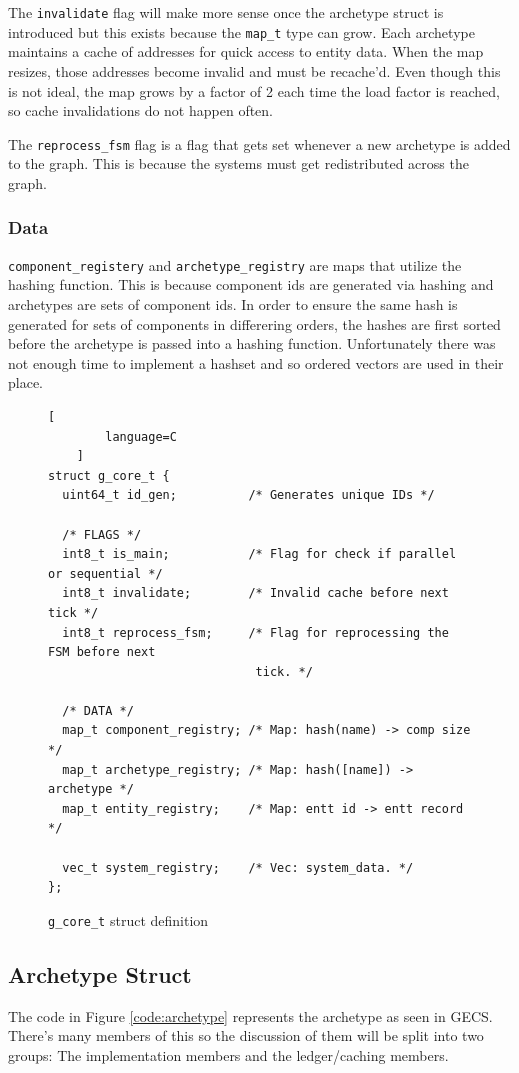 The \texttt{invalidate} flag will make more sense once the archetype struct is introduced but this exists because the \texttt{map\_t} type can grow. Each archetype maintains a cache of addresses for quick access to entity data. When the map resizes, those addresses become invalid and must be recache'd. Even though this is not ideal, the map grows by a factor of 2 each time the load factor is reached, so cache invalidations do not happen often. 

The \texttt{reprocess\_fsm} flag is a flag that gets set whenever a new archetype is added to the graph. This is because the systems must get redistributed across the graph.

\subsubsection{Data}
\texttt{component\_registery} and \texttt{archetype\_registry} are maps that utilize the hashing function. This is because component ids are generated via hashing and archetypes are sets of component ids. In order to ensure the same hash is generated for sets of components in differering orders, the hashes are first sorted before the archetype is passed into a hashing function. Unfortunately there was not enough time to implement a hashset and so ordered vectors are used in their place.

\begin{figure}[H]
    \begin{lstlisting}[
        language=C
    ]
struct g_core_t {
  uint64_t id_gen;          /* Generates unique IDs */
    
  /* FLAGS */
  int8_t is_main;           /* Flag for check if parallel or sequential */
  int8_t invalidate;        /* Invalid cache before next tick */
  int8_t reprocess_fsm;     /* Flag for reprocessing the FSM before next 
                             tick. */

  /* DATA */
  map_t component_registry; /* Map: hash(name) -> comp size */
  map_t archetype_registry; /* Map: hash([name]) -> archetype */
  map_t entity_registry;    /* Map: entt id -> entt record */
    
  vec_t system_registry;    /* Vec: system_data. */
};
    \end{lstlisting}
    \caption{\texttt{g\_core\_t} struct definition}
    \label{code:g_core_t}
\end{figure}

\subsection{Archetype Struct}
The code in Figure \ref{code:archetype} represents the archetype as seen in GECS. There's many members of this so the discussion of them will be split into two groups: The implementation members and the ledger/caching members. 

